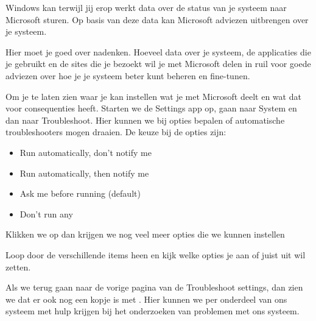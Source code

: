 Windows kan terwijl jij erop werkt data over de status van je systeem naar Microsoft sturen. Op basis van deze data kan Microsoft adviezen uitbrengen over je systeem.

Hier moet je goed over nadenken. Hoeveel data over je systeem, de applicaties die je gebruikt en de sites die je bezoekt wil je met Microsoft delen in ruil voor goede adviezen over hoe je je systeem beter kunt beheren en fine-tunen.

Om je te laten zien waar je kan instellen wat je met Microsoft deelt en wat dat voor consequenties heeft. Starten we de Settings app op, gaan naar System en dan naar Troubleshoot. Hier kunnen we bij opties bepalen of automatische troubleshooters mogen draaien. De keuze bij de opties zijn:
\begin{itemize}
\item Run automatically, don't notify me
\item Run automatically, then notify me
\item Ask me before running (default)
\item Don't run any
\end{itemize}

\begin{minipage}[t]{\linewidth}
\raggedright
{}
\end{minipage}

Klikken we op  dan krijgen we nog veel meer opties die we kunnen instellen

\begin{minipage}[t]{\linewidth}
\raggedright
{}
\end{minipage}

Loop door de verschillende items heen en kijk welke opties je aan of juist uit wil zetten.

Als we terug gaan naar de vorige pagina van de Troubleshoot settings, dan zien we dat er ook nog een kopje is met . Hier kunnen we per onderdeel van ons systeem met hulp krijgen bij het onderzoeken van problemen met ons systeem.

